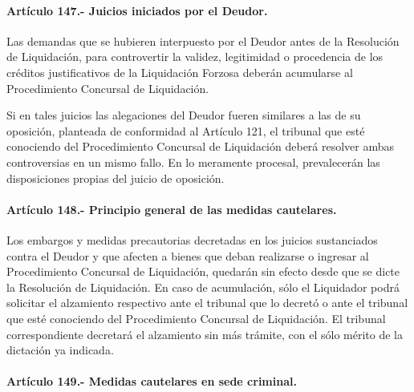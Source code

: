 \documentclass[
]{book}
\begin{document}
\hypertarget{artuxedculo-147.--juicios-iniciados-por-el-deudor.}{%
\paragraph*{Artículo 147.- Juicios iniciados por el Deudor.}\label{artuxedculo-147.--juicios-iniciados-por-el-deudor.}}

Las demandas que se hubieren interpuesto por el Deudor antes de la Resolución de Liquidación, para controvertir la validez, legitimidad o procedencia de los créditos justificativos de la Liquidación Forzosa deberán acumularse al Procedimiento Concursal de Liquidación.

Si en tales juicios las alegaciones del Deudor fueren similares a las de su oposición, planteada de conformidad al Artículo 121, el tribunal que esté conociendo del Procedimiento Concursal de Liquidación deberá resolver ambas controversias en un mismo fallo. En lo meramente procesal, prevalecerán las disposiciones propias del juicio de oposición.

\hypertarget{artuxedculo-148.--principio-general-de-las-medidas-cautelares.}{%
\paragraph*{Artículo 148.- Principio general de las medidas cautelares.}\label{artuxedculo-148.--principio-general-de-las-medidas-cautelares.}}

Los embargos y medidas precautorias decretadas en los juicios sustanciados contra el Deudor y que afecten a bienes que deban realizarse o ingresar al Procedimiento Concursal de Liquidación, quedarán sin efecto desde que se dicte la Resolución de Liquidación.
En caso de acumulación, sólo el Liquidador podrá solicitar el alzamiento respectivo ante el tribunal que lo decretó o ante el tribunal que esté conociendo del Procedimiento Concursal de Liquidación. El tribunal correspondiente decretará el alzamiento sin más trámite, con el sólo mérito de la dictación ya indicada.

\hypertarget{artuxedculo-149.--medidas-cautelares-en-sede-criminal.}{%
\paragraph*{Artículo 149.- Medidas cautelares en sede criminal.}\label{artuxedculo-149.--medidas-cautelares-en-sede-criminal.}}
\end{document}
